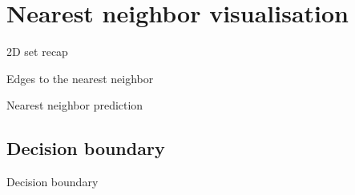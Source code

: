 \section{Nearest neighbor visualisation}

\begin{frame}{2D set recap}
\end{frame}

\begin{frame}{Edges to the nearest neighbor}
\end{frame}

\begin{frame}{Nearest neighbor prediction}
\end{frame}

\subsection{Decision boundary}

\begin{frame}{Decision boundary}
\end{frame}
